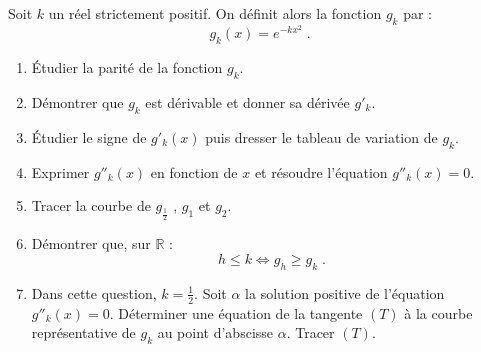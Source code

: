 \begin{exo}
Soit $k$ un r\'eel strictement positif. On d\'efinit alors la fonction $g_k$ par : $$ g_k (x) = e^{- k x^2} \; .$$
\begin{enumerate}
\item \'Etudier la parit\'e de la fonction $g_k$.
\item D\'emontrer que $g_k$ est d\'erivable et donner sa d\'eriv\'ee $g'_k$.
\item \'Etudier le signe de $g'_k (x)$ puis dresser le tableau de variation de $g_k$.
\item Exprimer $g''_k (x)$ en fonction de $x$ et r\'esoudre l'\'equation $g''_k (x) = 0$.
\item Tracer la courbe de $g_{\frac{1}{2}}$ , $g_1$ et $g_2 $.
\item D\'emontrer que, sur $\mathbb{R}$ : 
      $$ h \leq k \iff g_h \geq g_k  \; .$$
\item Dans cette question, $k = \frac{1}{2}$.
      Soit $\alpha$ la solution positive de l'\'equation $g''_k (x) = 0$.
      D\'eterminer une \'equation de la tangente $(T )$ \`a la courbe repr\'esentative de $g_k$ au point d'abscisse $\alpha$. 
      Tracer $(T )$.
\end{enumerate}
\end{exo}
